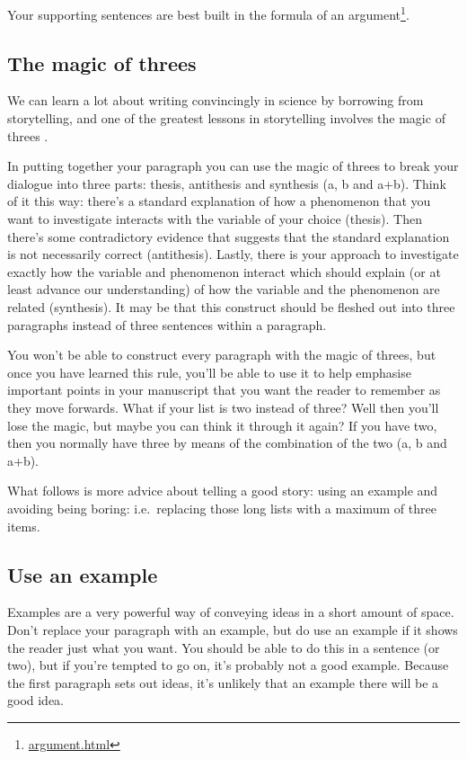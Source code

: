 \documentclass[
]{krantz}
\renewcommand{\href}[2]{#2\footnote{\url{#1}}}
\begin{document}
Your supporting sentences are best built in the formula of an \href{argument.html}{argument}.

\hypertarget{the-magic-of-threes}{%
\subsection{The magic of threes}\label{the-magic-of-threes}}

We can learn a lot about writing convincingly in science by borrowing from storytelling, and one of the greatest lessons in storytelling involves the magic of threes \citep{angler2020telling}.

In putting together your paragraph you can use the magic of threes to break your dialogue into three parts: thesis, antithesis and synthesis (a, b and a+b). Think of it this way: there's a standard explanation of how a phenomenon that you want to investigate interacts with the variable of your choice (thesis). Then there's some contradictory evidence that suggests that the standard explanation is not necessarily correct (antithesis). Lastly, there is your approach to investigate exactly how the variable and phenomenon interact which should explain (or at least advance our understanding) of how the variable and the phenomenon are related (synthesis). It may be that this construct should be fleshed out into three paragraphs instead of three sentences within a paragraph.

You won't be able to construct every paragraph with the magic of threes, but once you have learned this rule, you'll be able to use it to help emphasise important points in your manuscript that you want the reader to remember as they move forwards. What if your list is two instead of three? Well then you'll lose the magic, but maybe you can think it through it again? If you have two, then you normally have three by means of the combination of the two (a, b and a+b).

What follows is more advice about telling a good story: using an example and avoiding being boring: i.e.~replacing those long lists with a maximum of three items.

\hypertarget{use-an-example}{%
\subsection{Use an example}\label{use-an-example}}

Examples are a very powerful way of conveying ideas in a short amount of space. Don't replace your paragraph with an example, but do use an example if it shows the reader just what you want. You should be able to do this in a sentence (or two), but if you're tempted to go on, it's probably not a good example. Because the first paragraph sets out ideas, it's unlikely that an example there will be a good idea.
\end{document}
